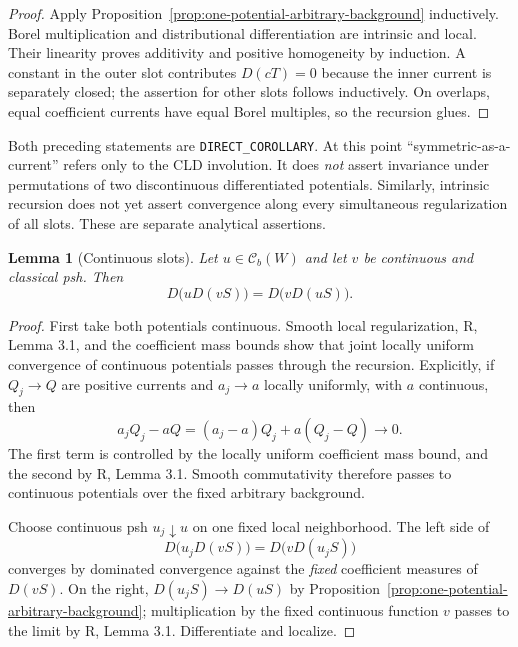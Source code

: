 \documentclass[11pt,a4paper]{article}
\numberwithin{equation}{section}
\newtheorem{lemma}[theorem]{Lemma}
\theoremstyle{definition}
\theoremstyle{remark}
\begin{document}
\begin{proof}
Apply Proposition~\ref{prop:one-potential-arbitrary-background}
inductively. Borel multiplication and distributional differentiation
are intrinsic and local. Their linearity proves additivity and positive
homogeneity by induction. A constant in the outer slot contributes
$D(cT)=0$ because the inner current is separately closed; the assertion
for other slots follows inductively. On overlaps, equal coefficient
currents have equal Borel multiples, so the recursion glues.
\end{proof}

Both preceding statements are \texttt{DIRECT\_COROLLARY}. At this
point ``symmetric-as-a-current'' refers only to the CLD involution.
It does \emph{not} assert invariance under permutations of two
discontinuous differentiated potentials. Similarly, intrinsic recursion
does not yet assert convergence along every simultaneous regularization
of all slots. These are separate analytical assertions.

\begin{lemma}[Continuous slots]
\label{lem:continuous-slot-exchange}
Let $u\in\mathcal C_b(W)$ and let $v$ be continuous and classical psh.
Then
\[
 D\bigl(uD(vS)\bigr)=D\bigl(vD(uS)\bigr).
\]
\end{lemma}

\begin{proof}
First take both potentials continuous. Smooth local regularization,
R, Lemma 3.1, and the coefficient mass bounds show that joint locally
uniform convergence of continuous potentials passes through the
recursion. Explicitly, if $Q_j\to Q$ are positive currents and
$a_j\to a$ locally uniformly, with $a$ continuous, then
\[
 a_jQ_j-aQ=(a_j-a)Q_j+a(Q_j-Q)\longrightarrow0.
\]
The first term is controlled by the locally uniform coefficient mass
bound, and the second by R, Lemma 3.1. Smooth commutativity therefore
passes to continuous potentials over the fixed arbitrary background.

Choose continuous psh $u_j\downarrow u$ on one fixed local
neighborhood. The left side of
\[
 D\bigl(u_jD(vS)\bigr)=D\bigl(vD(u_jS)\bigr)
\]
converges by dominated convergence against the \emph{fixed} coefficient
measures of $D(vS)$. On the right, $D(u_jS)\to D(uS)$ by
Proposition~\ref{prop:one-potential-arbitrary-background}; multiplication
by the fixed continuous function $v$ passes to the limit by R,
Lemma 3.1. Differentiate and localize.
\end{proof}
\end{document}

